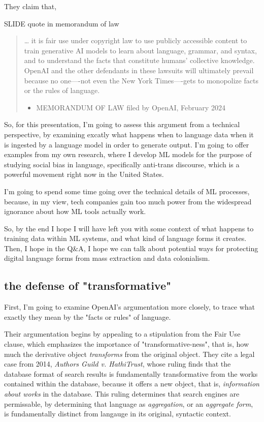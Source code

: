 \documentclass[11pt]{article}
\begin{document}
They claim that,

SLIDE quote in memorandum of law

\begin{quote}
\ldots{} it is fair use under copyright law to use publicly accessible
content to train generative AI models to learn about language,
grammar, and syntax, and to understand the facts that constitute
humans’ collective knowledge. OpenAI and the other defendants in these
lawsuits will ultimately prevail because no one—-not even the New York
Times—-gets to monopolize facts or the rules of language.

\begin{itemize}
\item MEMORANDUM OF LAW filed by OpenAI, February 2024
\end{itemize}
\end{quote}

So, for this presentation, I'm going to assess this argument from a
technical perspective, by examining excatly what happens when to
language data when it is ingested by a language model in order to
generate output. I'm going to offer examples from my own research,
where I develop ML models for the purpose of studying social bias in
language, specifically anti-trans discourse, which is a powerful
movement right now in the United States.

I'm going to spend some time going over the technical details of ML
processes, because, in my view, tech companies gain too much power
from the widespread ignorance about how ML tools actually work.

So, by the end I hope I will have left you with some context of what
happens to training data within ML systems, and what kind of language
forms it creates. Then, I hope in the Q\&A, I hope we can talk about
potential ways for protecting digital language forms from mass
extraction and data colonialism.

\subsection{the defense of "transformative"}
\label{sec:orgd8d5f73}
First, I'm going to examine OpenAI's argumentation more closely, to
trace what exactly they mean by the "facts or rules" of language.

Their argumentation begins by appealing to a stipulation from the Fair
Use clause, which emphasizes the importance of "transformative-ness",
that is, how much the derivative object \emph{transforms} from the original
object. They cite a legal case from 2014, \emph{Authors Guild v.
HathiTrust}, whose ruling finds that the database format of search
results is fundamentally transformative from the works contained
within the database, because it offers a new object, that is,
\emph{information about works} in the database. This ruling determines that
search engines are permissable, by determining that language as
\emph{aggregation}, or an \emph{aggregate form}, is fundamentally distinct from
langauge in its original, syntactic context.
\end{document}
